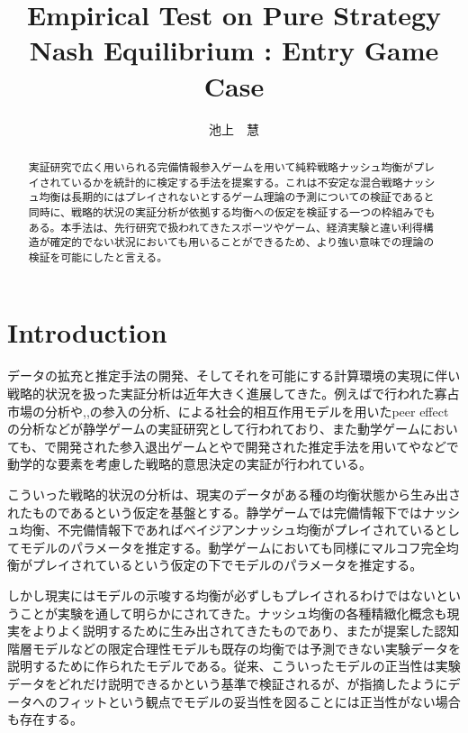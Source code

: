 \documentclass{jsarticle}
\begin{document}
\title{Empirical Test on Pure Strategy Nash Equilibrium : Entry Game Case}
\author{池上　慧}
\maketitle

\begin{abstract}
	実証研究で広く用いられる完備情報参入ゲームを用いて純粋戦略ナッシュ均衡がプレイされているかを統計的に検定する手法を提案する。これは不安定な混合戦略ナッシュ均衡は長期的にはプレイされないとするゲーム理論の予測についての検証であると同時に、戦略的状況の実証分析が依拠する均衡への仮定を検証する一つの枠組みでもある。本手法は、先行研究で扱われてきたスポーツやゲーム、経済実験と違い利得構造が確定的でない状況においても用いることができるため、より強い意味での理論の検証を可能にしたと言える。
\end{abstract}

\section{Introduction}
データの拡充と推定手法の開発、そしてそれを可能にする計算環境の実現に伴い戦略的状況を扱った実証分析は近年大きく進展してきた。例えば\cite{Publishing2010}で行われた寡占市場の分析や\cite{Bresnahan1991},\cite{Tamer2003a},\cite{Seim2006}の参入の分析、\cite{Brock2001a}による社会的相互作用モデルを用いたpeer effectの分析などが静学ゲームの実証研究として行われており、また動学ゲームにおいても、\cite{Pakes1994}で開発された参入退出ゲームと\cite{Aguirregabiria2007}や\cite{Bajari2007}で開発された推定手法を用いて\cite{Exler2013}や\cite{Ryan2012}などで動学的な要素を考慮した戦略的意思決定の実証が行われている。

こういった戦略的状況の分析は、現実のデータがある種の均衡状態から生み出されたものであるという仮定を基盤とする。静学ゲームでは完備情報下ではナッシュ均衡、不完備情報下であればベイジアンナッシュ均衡がプレイされているとしてモデルのパラメータを推定する。動学ゲームにおいても同様にマルコフ完全均衡がプレイされているという仮定の下でモデルのパラメータを推定する。

しかし現実にはモデルの示唆する均衡が必ずしもプレイされるわけではないということが実験を通して明らかにされてきた。ナッシュ均衡の各種精緻化概念も現実をよりよく説明するために生み出されてきたものであり、また\cite{Economics2014}が提案した認知階層モデルなどの限定合理性モデルも既存の均衡では予測できない実験データを説明するために作られたモデルである。従来、こういったモデルの正当性は実験データをどれだけ説明できるかという基準で検証されるが、\cite{Haile2016}が指摘したようにデータへのフィットという観点でモデルの妥当性を図ることには正当性がない場合も存在する。
\end{document}
